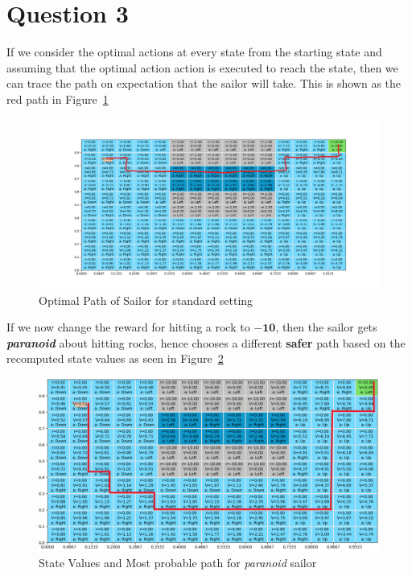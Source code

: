\documentclass[a4paper]{article}
\begin{document}
\section{Question 3}
If we consider the optimal actions at every state from the starting state and assuming that the optimal action action is executed to reach the state, then we can trace the path on expectation that the sailor will take. This is shown as the red path in Figure~\ref{fig-sailor-path}
\begin{figure}[ht!]
    \centering
    \includegraphics[width=\textwidth]{Sailor_path.png}
    \caption{Optimal Path of Sailor for standard setting}
    \label{fig-sailor-path}
\end{figure}
If we now change the reward for hitting a rock to $\mathbf{-10}$, then the sailor gets \textbf{\textit{paranoid}} about hitting rocks, hence chooses a different \textbf{safer} path based on the recomputed state values as seen in Figure~\ref{fig-paranoid-sailor-path}
\begin{figure}[ht!]
    \centering
    \includegraphics[width=\textwidth]{Paranoid_Sailor_path.png}
    \caption{State Values and Most probable path for \textit{paranoid} sailor}
    \label{fig-paranoid-sailor-path}
\end{figure}
\clearpage
\end{document}
